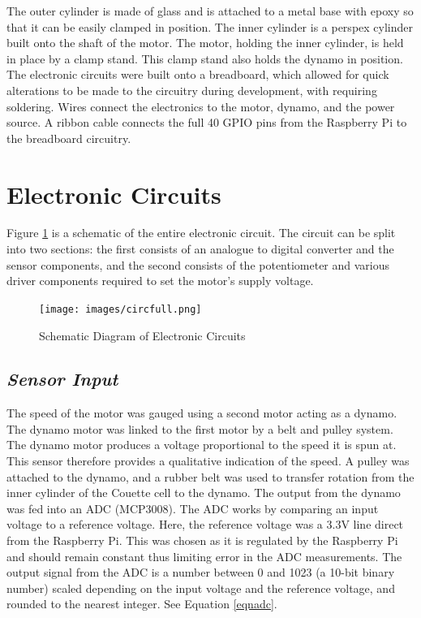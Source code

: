 \documentclass[twoside,a4]{report}
\def\br{\newline \newline \noindent}
\begin{document}
	\br
	The outer cylinder is made of glass and is attached to a metal base with epoxy so that it can be easily clamped in position. The inner cylinder is a perspex cylinder built onto the shaft of the motor. The motor, holding the inner cylinder, is held in place by a clamp stand. This clamp stand also holds the dynamo in position.\br
	The electronic circuits were built onto a breadboard, which allowed for quick alterations to be made to the circuitry during development, with requiring soldering. Wires connect the electronics to the motor, dynamo, and the power source. A ribbon cable connects the full 40 GPIO pins from the Raspberry Pi to the breadboard circuitry.
	
	\section{Electronic Circuits} %
	Figure \ref{circfull} is a schematic of the entire electronic circuit. The circuit can be split into two sections: the first consists of an analogue to digital converter and the sensor components, and the second consists of the potentiometer and various driver components required to set the motor's supply voltage.
	\begin{figure}[!htb]
		\centering
		\texttt{[image: images/circfull.png]}
		\caption{Schematic Diagram of Electronic Circuits}
		\label{circfull}
	\end{figure}

	\subsection*{\textit{Sensor Input}} %
	The speed of the motor was gauged using a second motor acting as a dynamo. The dynamo motor was linked to the first motor by a belt and pulley system. The dynamo motor produces a voltage proportional to the speed it is spun at. This sensor therefore provides a qualitative indication of the speed. A pulley was attached to the dynamo, and a rubber belt was used to transfer rotation from the inner cylinder of the Couette cell to the dynamo. The output from the dynamo was fed into an ADC (MCP3008). The ADC works by comparing an input voltage to a reference voltage. Here, the reference voltage was a 3.3V line direct from the Raspberry Pi. This was chosen as it is regulated by the Raspberry Pi and should remain constant thus limiting error in the ADC measurements. The output signal from the ADC is a number between 0 and 1023 (a 10-bit binary number) scaled depending on the input voltage and the reference voltage, and rounded to the nearest integer. See Equation \ref{eqnadc}.
	
\end{document}
